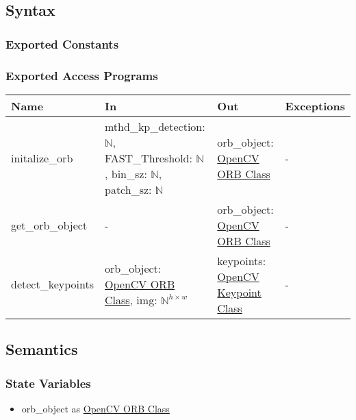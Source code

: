 \documentclass[12pt, titlepage]{article}
\begin{document}
\subsection{Syntax}

\subsubsection{Exported Constants}

\subsubsection{Exported Access Programs}

\begin{center}
\begin{tabular}{p{4cm} p{4.5cm} p{4cm} p{2cm}}
\hline
\textbf{Name} & \textbf{In} & \textbf{Out} & \textbf{Exceptions} \\
\hline
initalize\_orb 
& mthd\_kp\_detection: $\mathbb{N}$,\newline
FAST\_Threshold: $\mathbb{N}$, \newline
bin\_sz: $\mathbb{N}$, \newline
patch\_sz: $\mathbb{N}$
& orb\_object: \href{https://docs.opencv.org/3.4/db/d95/classcv_1_1ORB.html}{OpenCV ORB Class}
& - \\
\hline
get\_orb\_object 
& -
& orb\_object: \href{https://docs.opencv.org/3.4/db/d95/classcv_1_1ORB.html}{OpenCV ORB Class}
& - \\
\hline
detect\_keypoints 
& orb\_object: \href{https://docs.opencv.org/3.4/db/d95/classcv_1_1ORB.html}{OpenCV ORB Class}, \newline
img: $\mathbb{N}^{h \times w}$
& keypoints: \href{https://docs.opencv.org/3.4/d2/d29/classcv_1_1KeyPoint.html}{OpenCV Keypoint Class}
& - \\
\hline
\end{tabular}
\end{center}

\subsection{Semantics}

\subsubsection{State Variables}
\begin{itemize}
  \item orb\_object as \href{https://docs.opencv.org/3.4/db/d95/classcv_1_1ORB.html}{OpenCV ORB Class}
\end{itemize}
\end{document}
